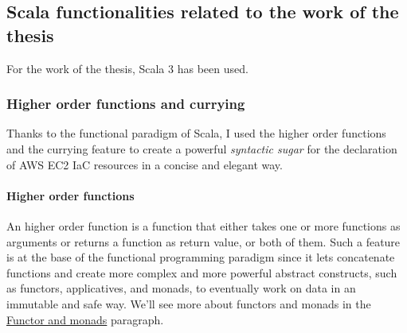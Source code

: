 \subsection{Scala functionalities related to the work of the thesis}
For the work of the thesis, Scala 3 has been used.

\subsubsection{Higher order functions and currying}
Thanks to the functional paradigm of Scala, I used the higher order functions and the currying feature to create a powerful \textit{syntactic sugar} for the declaration of AWS EC2 IaC resources in a 
concise and elegant way.
\paragraph{Higher order functions}
An higher order function is a function that either takes one or more functions as arguments or returns a function as return value, or both of them.
Such a feature is at the base of the functional programming paradigm since it lets concatenate functions and create more complex and more powerful abstract constructs, such as functors, applicatives, and monads, to eventually work on data in an immutable and safe way.
We'll see more about functors and monads in the \hyperref[sssec:functors-monads]{Functor and monads} paragraph.
